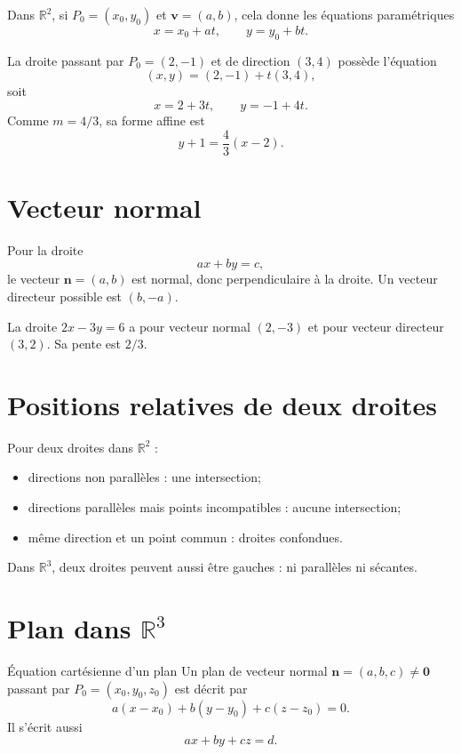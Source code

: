 \documentclass[12pt,a4paper,openany]{book}
\newcommand{\R}{\mathbb{R}}
\begin{document}
Dans $\R^2$, si $P_0=(x_0,y_0)$ et $\mathbf v=(a,b)$, cela donne les équations paramétriques
\[
x=x_0+at,
\qquad
y=y_0+bt.
\]

\begin{examplebox}
La droite passant par $P_0=(2,-1)$ et de direction $(3,4)$ possède l'équation
\[
(x,y)=(2,-1)+t(3,4),
\]
soit
\[
x=2+3t,
\qquad y=-1+4t.
\]
Comme $m=4/3$, sa forme affine est
\[
y+1=\frac43(x-2).
\]
\end{examplebox}

\section{Vecteur normal}

Pour la droite
\[
ax+by=c,
\]
le vecteur $\mathbf n=(a,b)$ est normal, donc perpendiculaire à la droite. Un vecteur directeur possible est $(b,-a)$.

\begin{examplebox}
La droite $2x-3y=6$ a pour vecteur normal $(2,-3)$ et pour vecteur directeur $(3,2)$. Sa pente est $2/3$.
\end{examplebox}

\section{Positions relatives de deux droites}

Pour deux droites dans $\R^2$ :
\begin{itemize}
\item directions non parallèles : une intersection;
\item directions parallèles mais points incompatibles : aucune intersection;
\item même direction et un point commun : droites confondues.
\end{itemize}
Dans $\R^3$, deux droites peuvent aussi être gauches : ni parallèles ni sécantes.

\section{Plan dans \texorpdfstring{$\R^3$}{R3}}

\begin{definition}{Équation cartésienne d'un plan}{}
Un plan de vecteur normal $\mathbf n=(a,b,c)\neq\mathbf0$ passant par $P_0=(x_0,y_0,z_0)$ est décrit par
\[
a(x-x_0)+b(y-y_0)+c(z-z_0)=0.
\]
Il s'écrit aussi
\[
ax+by+cz=d.
\]
\end{definition}
\end{document}
